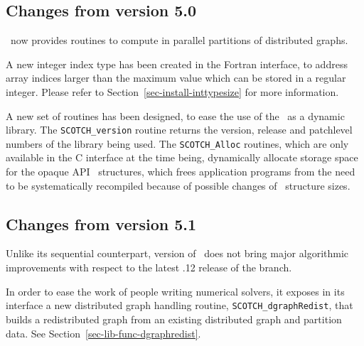 \subsection{Changes from version 5.0}

\ptscotch\ now provides routines to compute in
parallel partitions of distributed graphs.

A new integer index type has been created in the Fortran interface, to
address array indices larger than the maximum value which can be
stored in a regular integer. Please refer to
Section~\ref{sec-install-inttypesize} for more information.

A new set of routines has been designed, to ease the use of the
\libscotch\ as a dynamic library. The {\tt SCOTCH\_\lbt version}
routine returns the version, release and patchlevel numbers of the
library being used. The {\tt SCOTCH\_\lbt *Alloc} routines,
which are only available in the C interface at the time being,
dynamically allocate storage space for the opaque API
\scotch\ structures, which frees application programs from the need
to be systematically recompiled because of possible changes of
\scotch\ structure sizes.

\subsection{Changes from version 5.1}

Unlike its sequential counterpart, version {} of
\ptscotch\ does not bring major algorithmic improvements with respect
to the latest {.12} release of the {} branch.

In order to ease the work of people writing numerical solvers, it
exposes in its interface a new distributed graph handling routine,
{\tt SCOTCH\_\lbt dgraph\lbt Redist}, that builds a redistributed
graph from an existing distributed graph and partition data. See
Section~\ref{sec-lib-func-dgraphredist}.
